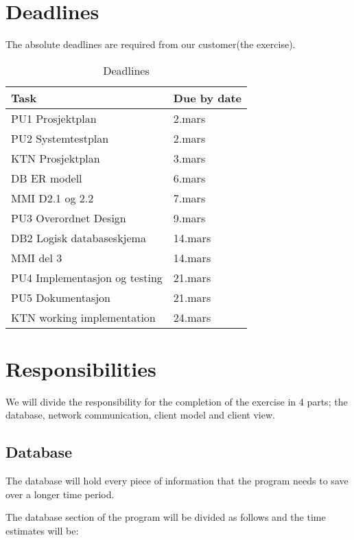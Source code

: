 \documentclass[a4paper, english, 12pt]{article}
\begin{document}
\section{Deadlines}
The absolute deadlines are required from our customer(the exercise). 
\begin{table}[h]
    \begin{center}
    \caption{Deadlines} 
    \label{deadline}
    \vspace{0,5cm}
    \begin{tabular}{| l | l |}  
        \hline
        Task & Due by date \\
        \hline 
    PU1  Prosjektplan & 2.mars \\
    PU2  Systemtestplan & 2.mars\\
    KTN  Prosjektplan & 3.mars\\
    DB   ER modell& 6.mars\\
    MMI  D2.1 og 2.2 & 7.mars\\
    PU3  Overordnet Design & 9.mars\\
    DB2  Logisk databaseskjema & 14.mars\\
    MMI  del 3 & 14.mars\\
    PU4  Implementasjon og testing & 21.mars\\
    PU5  Dokumentasjon & 21.mars\\
    KTN  working implementation & 24.mars\\
        \hline
    \end{tabular}
    \end{center}
\end{table}



\section{Responsibilities}
We will divide the responsibility for the completion of the exercise in 4 parts; the database, network communication, 
client model and client view. 
\subsection{Database}
The database will hold every piece of information that the program needs to save over a longer time period. 


The database section of the program will be divided as follows and the time estimates will be:
\end{document}
